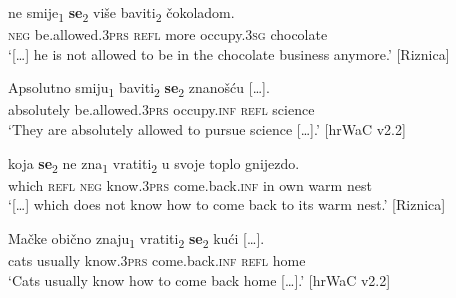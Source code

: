 \begin{exe}\ex\label{(15.3)}
\gll [\dots] ne smije\textsubscript{1} \textbf{se}\textsubscript{2} više baviti\textsubscript{2} čokoladom. \\
{} \textsc{neg} be.allowed.\textsc{3prs} \textsc{refl} more occupy.\textsc{3sg} chocolate \\
\glt ‘[\dots] he is not allowed  to be in the chocolate business anymore.’
\hfill [Riznica]

\ex\label{(15.4)}
\gll Apsolutno smiju\textsubscript{1} baviti\textsubscript{2} \textbf{se}\textsubscript{2} {znanošću  [\dots].} \\
absolutely be.allowed.\textsc{3prs} occupy.\textsc{inf} \textsc{refl} science \\
\glt ‘They are absolutely allowed to pursue science [\dots].’
\hfill [hrWaC v2.2]

\ex\label{(15.5)}
\gll [\dots] koja \textbf{se}\textsubscript{2} ne zna\textsubscript{1} vratiti\textsubscript{2} u svoje toplo gnijezdo. \\
 {} which \textsc{refl} \textsc{neg} know.\textsc{3prs} come.back.\textsc{inf} in own warm nest \\
\glt ‘[\dots] which does not know how to come back to its warm nest.’
\hfill [Riznica]

\ex\label{(15.6)}
\gll Mačke obično znaju\textsubscript{1} vratiti\textsubscript{2} \textbf{se}\textsubscript{2} {kući  [\dots].} \\
 cats usually know.\textsc{3prs} come.back.\textsc{inf} \textsc{refl} home  \\
\glt  ‘Cats usually know how to come back home [\dots].’
\hfill [hrWaC v2.2]
\end{exe}

